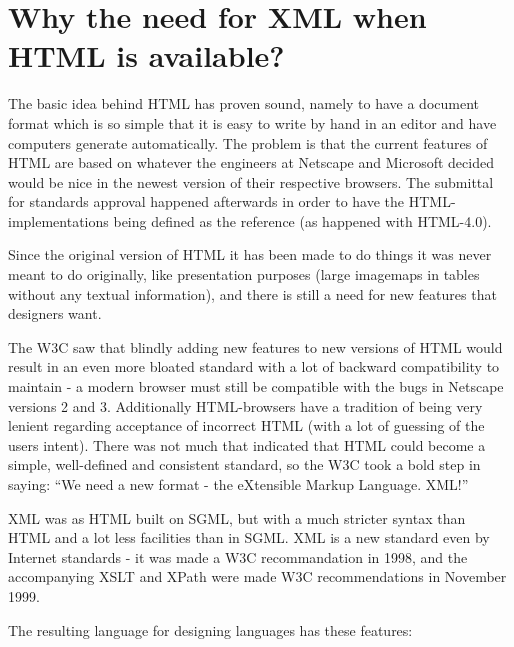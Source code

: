 \section{Why the need for XML when HTML is available?}

The basic idea behind HTML has proven sound, namely to have a document
format which is so simple that it is easy to write by hand in an
editor and have computers generate automatically. The problem is that
the current features of HTML are based on whatever the engineers at
Netscape and Microsoft decided would be nice in the newest version of
their respective browsers.  The submittal for standards approval
happened afterwards in order to have the HTML-implementations being
defined as the reference (as happened with HTML-4.0).

Since the original version of HTML it has been made to do things it
was never meant to do originally, like presentation purposes (large
imagemaps in tables without any textual information), and there is
still a need for new features that designers want.

The W3C saw that blindly adding new features to new
versions of HTML would result in an even more bloated standard with a
lot of backward compatibility to maintain - a modern browser must
still be compatible with the bugs in Netscape versions 2 and 3.
Additionally HTML-browsers have a tradition of being very lenient
regarding acceptance of incorrect HTML (with a lot of guessing of the
users intent).  There was not much that indicated that HTML could
become a simple, well-defined and consistent standard, so the W3C took
a bold step in saying: ``We need a new format - the eXtensible Markup
Language.  XML!''

XML was as HTML built on SGML, but with a much stricter syntax than
HTML and a lot less facilities than in SGML.  XML is a new standard
even by Internet standards - it was made a W3C recommandation in 1998,
and the accompanying XSLT and XPath were made W3C recommendations in
November 1999.


The resulting language for designing languages has these features:

